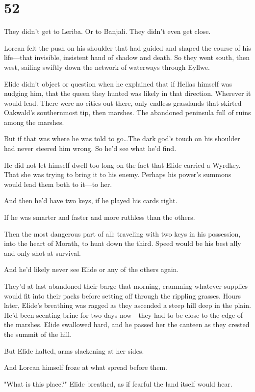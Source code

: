 
\chapter{52}

They didn't get to Leriba.
Or to Banjali.
They didn't even get close.

Lorcan felt the push on his shoulder that had guided and shaped the course of his life---that invisible, insistent hand of shadow and death.
So they went south, then west, sailing swiftly down the network of waterways through Eyllwe.

Elide didn't object or question when he explained that if Hellas himself was nudging him, that the queen they hunted was likely in that direction.
Wherever it would lead.
There were no cities out there, only endless grasslands that skirted Oakwald's southernmost tip, then marshes.
The abandoned peninsula full of ruins among the marshes.

But if that was where he was told to go\ldots The dark god's touch on his shoulder had never steered him wrong.
So he'd see what he'd find.

He did not let himself dwell too long on the fact that Elide carried a Wyrdkey.
That she was trying to bring it to his enemy.
Perhaps his power's summons would lead them both to it---to her.

And then he'd have two keys, if he played his cards right.

If he was smarter and faster and more ruthless than the others.

Then the most dangerous part of all: traveling with two keys in his possession, into the heart of Morath, to hunt down the third.
Speed would be his best ally and only shot at survival.

And he'd likely never see Elide or any of the others again.

They'd at last abandoned their barge that morning, cramming whatever supplies would fit into their packs before setting off through the rippling grasses.
Hours later, Elide's breathing was ragged as they ascended a steep hill deep in the plain.
He'd been scenting brine for two days now---they had to be close to the edge of the marshes.
Elide swallowed hard, and he passed her the canteen as they crested the summit of the hill.

But Elide halted, arms slackening at her sides.

And Lorcan himself froze at what spread before them.

"What is this place?"
Elide breathed, as if fearful the land itself would hear.

